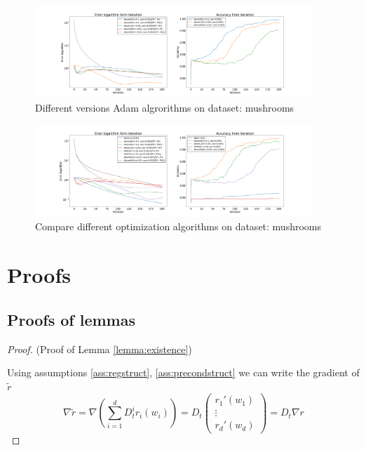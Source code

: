 \documentclass[USenglish]{article}
\theoremstyle{dgthm}
\theoremstyle{dgdef}
\begin{document}
\begin{figure}[H]
\centering
    \includegraphics[width=0.93\textwidth]{pictures/mushrooms/main_adam.png}
    \caption{Different versions Adam algrorithms on dataset: mushrooms}
    \label{fig:main_mushrooms_adam}
\end{figure}

\begin{figure}[H]
\centering
    \includegraphics[width=0.93\textwidth]{pictures/mushrooms/main_mushrooms.png}
    \caption{Compare different optimization algorithms on dataset: mushrooms}
    \label{fig:main_mushrooms}
\end{figure}


\section{Proofs}

\subsection{Proofs of lemmas}


\begin{proof} (Proof of Lemma \ref{lemma:existence})

Using assumptions \ref{ass:regstruct}, \ref{ass:precondstruct} we can write the gradient of $\widetilde{r}$
    \begin{equation*}
        \nabla \widetilde{r} = \nabla \left( \sum_{i=1}^d D_t^i r_i(w_i) \right) = D_t \begin{pmatrix}
  r_1'(w_1) \\
  \vdots  \\
  r_d'(w_d)
 \end{pmatrix} = D_t \nabla r
    \end{equation*}
\end{proof}
\end{document}
